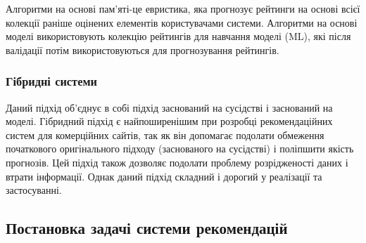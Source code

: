Алгоритми на основі пам'яті-це евристика, яка прогнозує рейтинги на основі всієї колекції раніше оцінених елементів користувачами системи.
Алгоритми на основі моделі використовують колекцію рейтингів для навчання моделі (ML), які після валідації потім використовуються для прогнозування рейтингів.

\subsubsection{Гібридні системи}
Даний підхід об'єднує в собі підхід заснований на сусідстві і заснований на моделі. Гібридний підхід є найпоширенішим при розробці рекомендаційних систем для комерційних сайтів, так як він допомагає подолати обмеження початкового оригінального підходу (заснованого на сусідстві) і поліпшити якість прогнозів. Цей підхід також дозволяє подолати проблему розрідженості даних і втрати інформації. Однак даний підхід складний і дорогий у реалізації та застосуванні.

\subsection{Постановка задачі системи рекомендацій}

